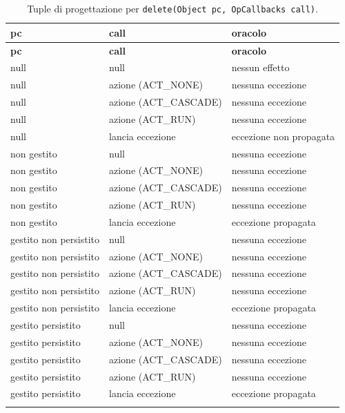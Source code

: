 {\footnotesize\setlength{\tabcolsep}{3pt}
\begin{longtable}{>{\raggedright\arraybackslash}p{}>{\raggedright\arraybackslash}p{}>{\raggedright\arraybackslash}p{}}
\toprule
\textbf{pc} & \textbf{call} & \textbf{oracolo} \\
\midrule
\endfirsthead
\toprule
\textbf{pc} & \textbf{call} & \textbf{oracolo} \\
\midrule
\endhead
\bottomrule
\endfoot
null & null & nessun effetto \\
null & azione (ACT\_NONE) & nessuna eccezione \\
null & azione (ACT\_CASCADE) & nessuna eccezione \\
null & azione (ACT\_RUN) & nessuna eccezione \\
null & lancia eccezione & eccezione non propagata \\
non gestito & null & nessuna eccezione \\
non gestito & azione (ACT\_NONE) & nessuna eccezione \\
non gestito & azione (ACT\_CASCADE) & nessuna eccezione \\
non gestito & azione (ACT\_RUN) & nessuna eccezione \\
non gestito & lancia eccezione & eccezione propagata \\
gestito non persistito & null & nessuna eccezione \\
gestito non persistito & azione (ACT\_NONE) & nessuna eccezione \\
gestito non persistito & azione (ACT\_CASCADE) & nessuna eccezione \\
gestito non persistito & azione (ACT\_RUN) & nessuna eccezione \\
gestito non persistito & lancia eccezione & eccezione propagata \\
gestito persistito & null & nessuna eccezione \\
gestito persistito & azione (ACT\_NONE) & nessuna eccezione \\
gestito persistito & azione (ACT\_CASCADE) & nessuna eccezione \\
gestito persistito & azione (ACT\_RUN) & nessuna eccezione \\
gestito persistito & lancia eccezione & eccezione propagata \\
\bottomrule
\caption{Tuple di progettazione per \texttt{delete(Object pc, OpCallbacks call)}.}
\label{tab:delete-tuple}
\end{longtable}
}



